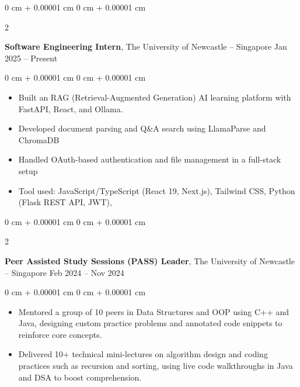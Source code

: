 \documentclass[10pt, letterpaper]{article}
\newenvironment{highlights}{
    \begin{itemize}[
        topsep=0.10 cm,
        parsep=0.10 cm,
        partopsep=0pt,
        itemsep=0pt,
        leftmargin=0 cm + 10pt
    ]
}{
    \end{itemize}
} %
\newenvironment{onecolentry}{
    \begin{adjustwidth}{
        0 cm + 0.00001 cm
    }{
        0 cm + 0.00001 cm
    }
}{
    \end{adjustwidth}
} %
\newenvironment{twocolentry}[2][]{
    \onecolentry
    \def\secondColumn{#2}
    \setcolumnwidth{\fill, 4.5 cm}
    \begin{paracol}{2}
}{
    \switchcolumn \raggedleft \secondColumn
    \end{paracol}
    \endonecolentry
} %
\begin{document}
                \begin{twocolentry}{
                    Jan 2025 – Present
                }
                    \textbf{Software Engineering Intern}, The University of Newcastle -- Singapore \end{twocolentry}
                \vspace{0.10 cm}
                \begin{onecolentry}
                    \begin{highlights}
                        \item Built an RAG (Retrieval-Augmented Generation) AI learning platform with FastAPI, React, and Ollama. 
                        \item Developed document parsing and Q\&A search using LlamaParse and ChromaDB
                        \item Handled OAuth-based authentication and file management in a full-stack setup
                        \item Tool used: JavaScript/TypeScript (React 19, Next.js), Tailwind CSS, Python (Flask REST API, JWT),
                    \end{highlights}
                \end{onecolentry}
                
                \vspace{0.2 cm}
        
                \begin{twocolentry}{
                    Feb 2024 – Nov 2024
                }
                    \textbf{Peer Assisted Study Sessions (PASS) Leader}, The University of Newcastle -- Singapore \end{twocolentry}
                \vspace{0.10 cm}
                \begin{onecolentry}
                    \begin{highlights}
                        \item Mentored a group of 10 peers in Data Structures and OOP using C++ and Java, designing custom practice problems and annotated code snippets to reinforce core concepts.
                        \item Delivered 10+ technical mini-lectures on algorithm design and coding practices such as recursion and sorting, using live code walkthroughs in Java and DSA to boost comprehension.
                    \end{highlights}
                \end{onecolentry}
                
\end{document}
